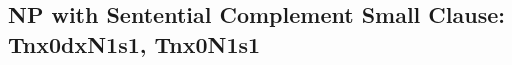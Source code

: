 


\subsection{NP with Sentential Complement Small Clause: Tnx0dxN1s1, Tnx0N1s1}
\label{nx0N1s1-family}

